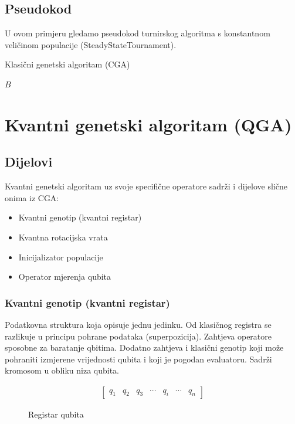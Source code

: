\documentclass[times, utf8, zavrsni, numeric]{fer}
\begin{document}
\subsection{Pseudokod}
U ovom primjeru gledamo pseudokod turnirskog algoritma s konstantnom veličinom populacije (SteadyStateTournament).
\begin{algorithm}
\caption{Klasični genetski algoritam (CGA)}
\label{algo:cga}
\begin{algorithmic}
\ENDWHILE
\RETURN $B$
\end{algorithmic}
\end{algorithm}

\newpage

\section{Kvantni genetski algoritam (QGA)}
\subsection{Dijelovi}
Kvantni genetski algoritam uz svoje specifične operatore sadrži i dijelove slične onima iz CGA:
\begin{itemize}
\item Kvantni genotip (kvantni registar)
\item Kvantna rotacijska vrata
\item Inicijalizator populacije
\item Operator mjerenja qubita
\end{itemize}

\subsubsection{Kvantni genotip (kvantni registar)}
Podatkovna struktura koja opisuje jednu jedinku. Od klasičnog registra se razlikuje u principu pohrane podataka (superpozicija). Zahtjeva operatore sposobne za baratanje qbitima. Dodatno zahtjeva i klasični genotip koji može pohraniti izmjerene vrijednosti qubita i koji je pogodan evaluatoru. Sadrži kromosom u obliku niza qubita.
\begin{figure}[htb]
\centering
\begin{align*}
\begin{bmatrix}
q_1 & q_2 & q_3 & \cdots & q_i & \cdots & q_n
\end{bmatrix}
\end{align*}
\caption{Registar qubita}
\end{figure}
\end{document}

